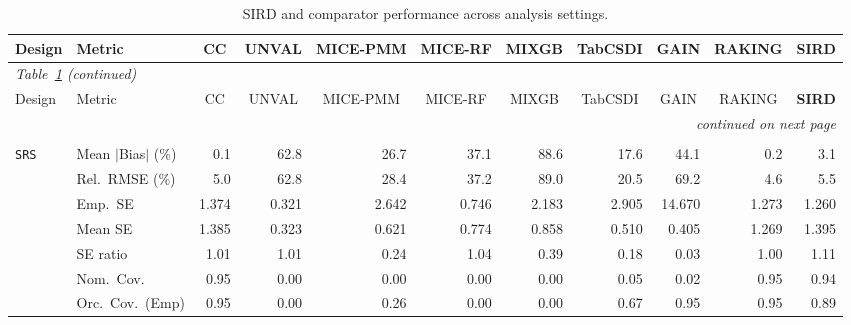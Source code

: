 \begin{landscape}
\footnotesize\setlength{\tabcolsep}{3.5pt}
\begin{longtable}{llrrrrrrrrr}
\caption{SIRD and comparator performance across analysis settings.}
\label{tab:appc_nutri_Gaussian} \\
\toprule
Design & Metric & \multicolumn{1}{c}{CC} & \multicolumn{1}{c}{UNVAL} & \multicolumn{1}{c}{MICE-PMM} & \multicolumn{1}{c}{MICE-RF} & \multicolumn{1}{c}{MIXGB} & \multicolumn{1}{c}{TabCSDI} & \multicolumn{1}{c}{GAIN} & \multicolumn{1}{c}{RAKING} & \multicolumn{1}{c}{\textbf{SIRD}} \\
\midrule \endfirsthead
\multicolumn{11}{l}{\footnotesize\itshape Table~\ref{tab:appc_nutri_Gaussian} (continued)} \\
\toprule
Design & Metric & \multicolumn{1}{c}{CC} & \multicolumn{1}{c}{UNVAL} & \multicolumn{1}{c}{MICE-PMM} & \multicolumn{1}{c}{MICE-RF} & \multicolumn{1}{c}{MIXGB} & \multicolumn{1}{c}{TabCSDI} & \multicolumn{1}{c}{GAIN} & \multicolumn{1}{c}{RAKING} & \multicolumn{1}{c}{\textbf{SIRD}} \\
\midrule \endhead
\midrule \multicolumn{11}{r}{\footnotesize\itshape continued on next page} \\
\endfoot
\bottomrule \endlastfoot
\multicolumn{11}{l}{\textbf{Continuous Phase-Two Covariates}} \\
\addlinespace[2pt]
\quad \texttt{SRS} & Mean $|$Bias$|$ (\%) & \cellcolor{rankone}0.1 & 62.8 & 26.7 & 37.1 & 88.6 & 17.6 & 44.1 & \cellcolor{ranktwo}0.2 & \cellcolor{rankthree}3.1 \\
 & Rel.\ RMSE (\%) & \cellcolor{ranktwo}5.0 & 62.8 & 28.4 & 37.2 & 89.0 & 20.5 & 69.2 & \cellcolor{rankone}4.6 & \cellcolor{rankthree}5.5 \\
 & Emp.\ SE & 1.374 & 0.321 & 2.642 & 0.746 & 2.183 & 2.905 & 14.670 & 1.273 & 1.260 \\
 & Mean SE & 1.385 & 0.323 & 0.621 & 0.774 & 0.858 & 0.510 & 0.405 & 1.269 & 1.395 \\
 & SE ratio & \cellcolor{ranktwo}1.01 & \cellcolor{ranktwo}1.01 & 0.24 & \cellcolor{rankthree}1.04 & 0.39 & 0.18 & 0.03 & \cellcolor{rankone}1.00 & 1.11 \\
 & Nom.\ Cov. & \cellcolor{rankone}0.95 & 0.00 & 0.00 & 0.00 & 0.00 & \cellcolor{rankthree}0.05 & 0.02 & \cellcolor{rankone}0.95 & \cellcolor{ranktwo}0.94 \\
 & Orc.\ Cov.\ (Emp) & \cellcolor{rankone}0.95 & 0.00 & 0.26 & 0.00 & 0.00 & \cellcolor{rankthree}0.67 & \cellcolor{rankone}0.95 & \cellcolor{rankone}0.95 & \cellcolor{ranktwo}0.89 \\

\end{longtable}
\end{landscape}
